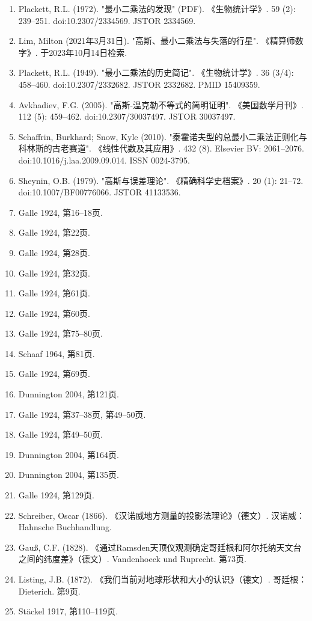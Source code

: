 \begin{enumerate}
\item Plackett, R.L. (1972). "最小二乘法的发现" (PDF). 《生物统计学》. 59 (2): 239–251. doi:10.2307/2334569. JSTOR 2334569.  
\item Lim, Milton (2021年3月31日). "高斯、最小二乘法与失落的行星". 《精算师数字》. 于2023年10月14日检索.  
\item Plackett, R.L. (1949). "最小二乘法的历史简记". 《生物统计学》. 36 (3/4): 458–460. doi:10.2307/2332682. JSTOR 2332682. PMID 15409359.  
\item Avkhadiev, F.G. (2005). "高斯-温克勒不等式的简明证明". 《美国数学月刊》. 112 (5): 459–462. doi:10.2307/30037497. JSTOR 30037497.  
\item Schaffrin, Burkhard; Snow, Kyle (2010). "泰霍诺夫型的总最小二乘法正则化与科林斯的古老赛道". 《线性代数及其应用》. 432 (8). Elsevier BV: 2061–2076. doi:10.1016/j.laa.2009.09.014. ISSN 0024-3795.  
\item Sheynin, O.B. (1979). "高斯与误差理论". 《精确科学史档案》. 20 (1): 21–72. doi:10.1007/BF00776066. JSTOR 41133536.  
\item Galle 1924, 第16–18页.  
\item Galle 1924, 第22页.  
\item Galle 1924, 第28页.  
\item Galle 1924, 第32页.  
\item Galle 1924, 第61页.  
\item Galle 1924, 第60页.  
\item Galle 1924, 第75–80页.  
\item Schaaf 1964, 第81页.  
\item Galle 1924, 第69页.  
\item Dunnington 2004, 第121页.  
\item Galle 1924, 第37–38页, 第49–50页.  
\item Galle 1924, 第49–50页.  
\item Dunnington 2004, 第164页.  
\item Dunnington 2004, 第135页.  
\item Galle 1924, 第129页.  
\item Schreiber, Oscar (1866). 《汉诺威地方测量的投影法理论》（德文）. 汉诺威：Hahnsche Buchhandlung.  
\item Gauß, C.F. (1828). 《通过Ramsden天顶仪观测确定哥廷根和阿尔托纳天文台之间的纬度差》（德文）. Vandenhoeck und Ruprecht. 第73页.  
\item Listing, J.B. (1872). 《我们当前对地球形状和大小的认识》（德文）. 哥廷根：Dieterich. 第9页.  
\item Stäckel 1917, 第110–119页.  

\end{enumerate}
